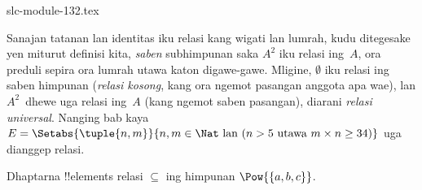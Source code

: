 \begin{filecontents*}[overwrite]{slc-module-132.tex}
\begin{explain}
Sanajan tatanan lan identitas iku relasi kang wigati lan lumrah,
kudu ditegesake yen miturut definisi kita, \emph{saben}
subhimpunan saka $A^{2}$ iku relasi ing~$A$,
ora preduli sepira ora lumrah utawa katon digawe-gawe.
Mligine, $\emptyset$ iku relasi ing saben himpunan
(\emph{relasi kosong}, kang ora ngemot pasangan anggota apa wae),
lan $A^{2}$~dhewe uga relasi ing~$A$
(kang ngemot saben pasangan), diarani \emph{relasi universal}.
Nanging bab kaya
$E=\Setabs{\tuple{n, m}}{n,m\in\Nat \text{ lan }(n>5 \text{ utawa } m \times n \ge 34)}$
uga dianggep relasi.
\end{explain}

\begin{prob}
  Dhaptarna !!{element}s relasi $\subseteq$ ing himpunan
  $\Pow{\{a, b, c\}}$.
\end{prob}


\end{filecontents*}


